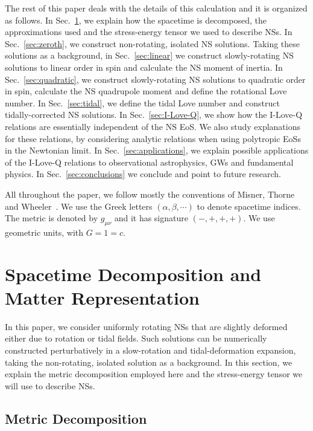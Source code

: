 \documentclass[aps,twocolumn,nofootinbib,showpacs,superscriptaddress,hyperref]{revtex4-1}
\begin{document}
The rest of this paper deals with the details of this calculation and it is organized as follows. In Sec.~\ref{sec:decomp}, we explain how the spacetime is decomposed, the approximations used and the stress-energy tensor we used to describe NSs. In Sec.~\ref{sec:zeroth}, we construct non-rotating, isolated NS solutions. Taking these solutions as a background, in Sec.~\ref{sec:linear} we construct slowly-rotating NS solutions to linear order in spin and calculate the NS moment of inertia. In Sec.~\ref{sec:quadratic}, we construct slowly-rotating NS solutions to quadratic order in spin, calculate the NS quadrupole moment and define the rotational Love number.  In Sec.~\ref{sec:tidal}, we define the tidal Love number and construct tidally-corrected NS solutions. In Sec.~\ref{sec:I-Love-Q}, we show how the I-Love-Q relations are essentially independent of the NS EoS. We also study explanations for these relations, by considering analytic relations when using polytropic EoSs in the Newtonian limit. In Sec.~\ref{sec:applications}, we explain possible applications of the I-Love-Q relations to observational astrophysics, GWs and fundamental physics. In Sec.~\ref{sec:conclusions} we conclude and point to future research. 

All throughout the paper, we follow mostly the conventions of Misner, Thorne and Wheeler~\cite{MTW}. We use the Greek letters $(\alpha, \beta, \cdots)$ to denote spacetime indices. The metric is denoted by $g_{\mu \nu}$ and it has signature $(-,+,+,+)$. We use geometric units, with $G=1=c$.

\section{Spacetime Decomposition and Matter Representation}
\label{sec:decomp}

In this paper, we consider uniformly rotating NSs that are slightly deformed either due to rotation or tidal fields. Such solutions can be numerically constructed perturbatively in a slow-rotation and tidal-deformation expansion, taking the non-rotating, isolated solution as a background. In this section, we explain the metric decomposition employed here and the stress-energy tensor we will use to describe NSs.

\subsection{Metric Decomposition}
\end{document}
